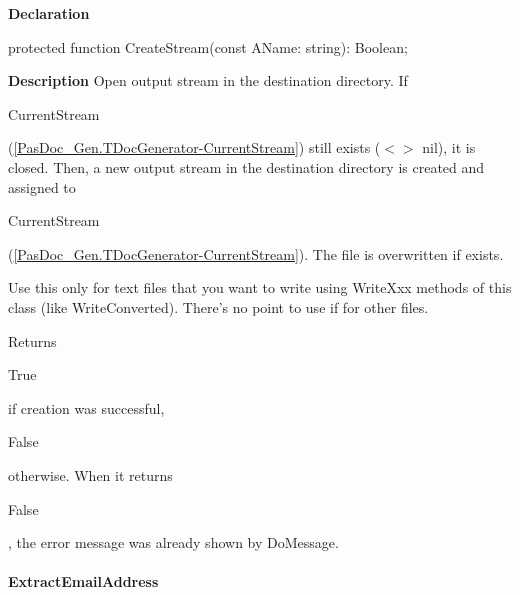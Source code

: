 \documentclass{report}
\newif\ifpdf
\begin{document}
\label{PasDoc_Gen.TDocGenerator-CreateStream}
\begin{list}{}{
\setlength{\itemindent}{0cm}
\setlength{\listparindent}{0cm}
\setlength{\leftmargin}{\evensidemargin}
\addtolength{\leftmargin}{\tmplength}
\settowidth{\labelsep}{X}
\addtolength{\leftmargin}{\labelsep}
\setlength{\labelwidth}{\tmplength}
}
\item[\textbf{Declaration}\hfill]
\ifpdf
\begin{flushleft}
\fi
\begin{ttfamily}
protected function CreateStream(const AName: string): Boolean;\end{ttfamily}

\ifpdf
\end{flushleft}
\fi

\par
\item[\textbf{Description}]
Open output stream in the destination directory. If \begin{ttfamily}CurrentStream\end{ttfamily}(\ref{PasDoc_Gen.TDocGenerator-CurrentStream}) still exists ({$<$}{$>$} nil), it is closed. Then, a new output stream in the destination directory is created and assigned to \begin{ttfamily}CurrentStream\end{ttfamily}(\ref{PasDoc_Gen.TDocGenerator-CurrentStream}). The file is overwritten if exists.

Use this only for text files that you want to write using WriteXxx methods of this class (like WriteConverted). There's no point to use if for other files.

Returns \begin{ttfamily}True\end{ttfamily} if creation was successful, \begin{ttfamily}False\end{ttfamily} otherwise. When it returns \begin{ttfamily}False\end{ttfamily}, the error message was already shown by DoMessage.

\end{list}
\paragraph*{ExtractEmailAddress}\hspace*{\fill}
\end{document}
